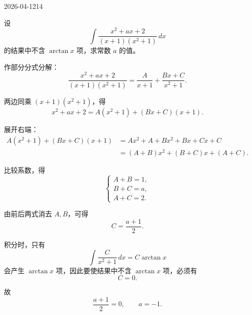 \begin{mistake}{2026-04-12}{14}

\begin{problemcontent}
设
\[
\int \frac{x^2+ax+2}{(x+1)(x^2+1)}\,dx
\]
的结果中不含 \(\arctan x\) 项，求常数 \(a\) 的值。

\end{problemcontent}

\begin{solutioncontent}
作部分分式分解：
\[
\frac{x^2+ax+2}{(x+1)(x^2+1)}=\frac{A}{x+1}+\frac{Bx+C}{x^2+1}.
\]

两边同乘 \((x+1)(x^2+1)\)，得
\[
x^2+ax+2=A(x^2+1)+(Bx+C)(x+1).
\]

展开右端：
\[
\begin{aligned}
A(x^2+1)+(Bx+C)(x+1)
&=Ax^2+A+Bx^2+Bx+Cx+C\\
&=(A+B)x^2+(B+C)x+(A+C).
\end{aligned}
\]

比较系数，得
\[
\begin{cases}
A+B=1,\\
B+C=a,\\
A+C=2.
\end{cases}
\]

由前后两式消去 \(A,B\)，可得
\[
C=\frac{a+1}{2}.
\]

积分时，只有
\[
\int \frac{C}{x^2+1}\,dx=C\arctan x
\]
会产生 \(\arctan x\) 项，因此要使结果中不含 \(\arctan x\) 项，必须有
\[
C=0.
\]

故
\[
\frac{a+1}{2}=0,
\qquad
a=-1.
\]

\end{solutioncontent}


\end{mistake}
